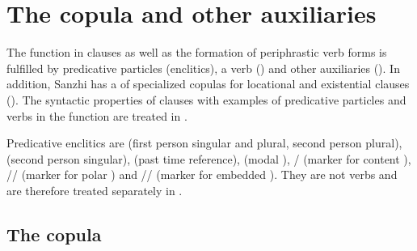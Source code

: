 \chapter{The copula and other auxiliaries}
\label{cpt:copulaotherauxiliaries}

The  function in  clauses as well as the formation of periphrastic verb forms is fulfilled by predicative particles (enclitics), a  verb () and other auxiliaries (). In addition, Sanzhi has a  of specialized copulas for locational and existential clauses (). The syntactic properties of  clauses with examples of predicative particles and verbs in the  function are treated in .

Predicative enclitics are  (first person singular and plural, second person plural),  (second person singular),  (past time reference),  (modal ), \slash{} (marker for content ), \slash{}\slash{} (marker for polar ) and \slash{}\slash{} (marker for embedded ). They are not verbs and are therefore treated separately in .



\section{The copula}
\label{sec:The copula}

